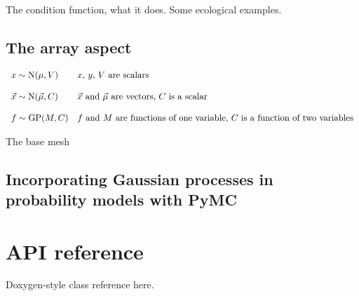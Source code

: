 \documentclass{report}
\begin{document}
The condition function, what it does. Some ecological examples.



\section{The array aspect}\label{sec:array} %

\begin{equation}
    \begin{array}{ll}
        x\sim\textup N(\mu,V) & \textup{$x$, $y$, $V$ are scalars}\\\\
        \vec x\sim\textup N(\vec \mu,C)& \textup{$\vec x$ and $\vec \mu$ are vectors, $C$ is a scalar}\\\\
        f\sim\textup{GP}(M, C) & \textup{$f$ and $M$ are functions of one variable, $C$ is a function of two variables}
    \end{array}
\end{equation}

The base mesh



\section{Incorporating Gaussian processes in probability models with PyMC}\label{sec:PyMC} %



\chapter{API reference}\label{cha:reference} 

Doxygen-style class reference here.
\end{document}
